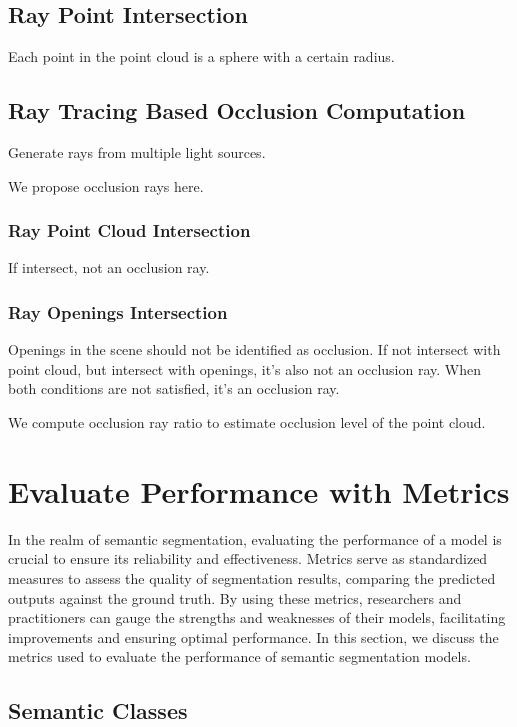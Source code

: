 \documentclass[11pt, a4paper,oneside,chapterprefix=false]{scrbook}
\begin{document}
\subsection{Ray Point Intersection}

Each point in the point cloud is a sphere with a certain radius.

\subsection{Ray Tracing Based Occlusion Computation}

Generate rays from multiple light sources. 

We propose occlusion rays here.

\subsubsection{Ray Point Cloud Intersection}

If intersect, not an occlusion ray.

\subsubsection{Ray Openings Intersection}

Openings in the scene should not be identified as occlusion. If not intersect with point cloud, but intersect with openings, it's also not an occlusion ray. When both conditions are not satisfied, it's an occlusion ray.

We compute occlusion ray ratio to estimate occlusion level of the point cloud.

\section{Evaluate Performance with Metrics}

In the realm of semantic segmentation, evaluating the performance of a model is crucial to ensure its reliability and effectiveness. Metrics serve as standardized measures to assess the quality of segmentation results, comparing the predicted outputs against the ground truth. By using these metrics, researchers and practitioners can gauge the strengths and weaknesses of their models, facilitating improvements and ensuring optimal performance. In this section, we discuss the metrics used to evaluate the performance of semantic segmentation models.

\subsection{Semantic Classes}
\end{document}
